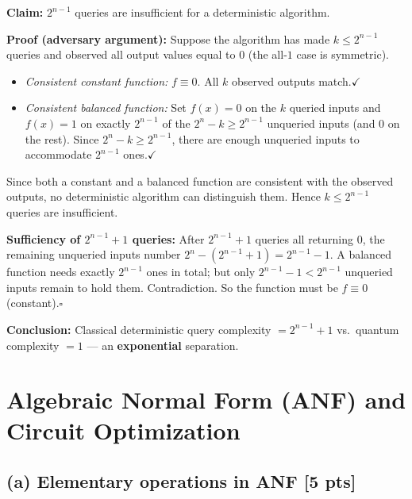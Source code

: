 \documentclass[11pt,a4paper]{article}
\begin{document}
\textbf{Claim:} $2^{n-1}$ queries are insufficient for a deterministic algorithm.

\textbf{Proof (adversary argument):}
Suppose the algorithm has made $k\le2^{n-1}$ queries and observed all output values equal to $0$
(the all-$1$ case is symmetric).

\begin{itemize}
  \item \emph{Consistent constant function:} $f\equiv0$. All $k$ observed outputs match.\;$\checkmark$
  \item \emph{Consistent balanced function:} Set $f(x)=0$ on the $k$ queried inputs
    and $f(x)=1$ on exactly $2^{n-1}$ of the $2^n-k\ge2^{n-1}$ unqueried inputs
    (and $0$ on the rest). Since $2^n-k\ge2^{n-1}$, there are enough unqueried inputs
    to accommodate $2^{n-1}$ ones.\;$\checkmark$
\end{itemize}

Since both a constant and a balanced function are consistent with the observed outputs,
no deterministic algorithm can distinguish them. Hence $k\le2^{n-1}$ queries are insufficient.

\textbf{Sufficiency of $2^{n-1}+1$ queries:}
After $2^{n-1}+1$ queries all returning $0$, the remaining unqueried inputs number
$2^n-(2^{n-1}+1)=2^{n-1}-1$.
A balanced function needs exactly $2^{n-1}$ ones in total; but only $2^{n-1}-1<2^{n-1}$ unqueried
inputs remain to hold them. Contradiction. So the function must be $f\equiv0$ (constant).\;$\square$

\textbf{Conclusion:} Classical deterministic query complexity $=2^{n-1}+1$ vs.\ quantum complexity $=1$
--- an \textbf{exponential} separation.

\newpage
\section{Algebraic Normal Form (ANF) and Circuit Optimization}

\subsection*{(a) Elementary operations in ANF [5 pts]}
\end{document}

